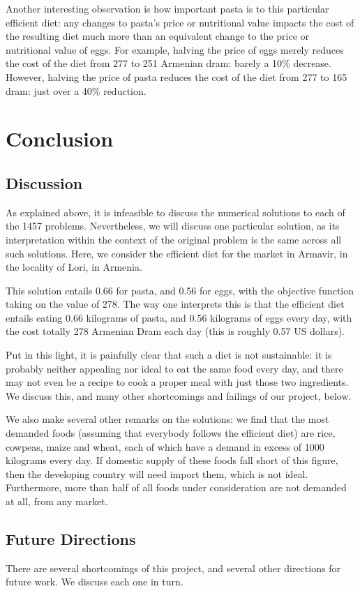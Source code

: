 Another interesting observation is how important pasta is to this particular efficient diet: any changes to pasta's price or nutritional value impacts the cost of the resulting diet much more than an equivalent change to the price or nutritional value of eggs. For example, halving the price of eggs merely reduces the cost of the diet from 277 to 251 Armenian dram: barely a 10\% decrease. However, halving the price of pasta reduces the cost of the diet from 277 to 165 dram: just over a 40\% reduction.

\section{Conclusion}
\subsection{Discussion}
As explained above, it is infeasible to discuss the numerical solutions to each of the 1457 problems. Nevertheless, we will discuss one particular solution, as its interpretation within the context of the original problem is the same across all such solutions. Here, we consider the efficient diet for the market in Armavir, in the locality of Lori, in Armenia.

This solution entails 0.66 for pasta, and 0.56 for eggs, with the objective function taking on the value of 278. The way one interprets this is that the efficient diet entails eating 0.66 kilograms of pasta, and 0.56 kilograms of eggs every day, with the cost totally 278 Armenian Dram each day (this is roughly 0.57 US dollars).

Put in this light, it is painfully clear that such a diet is not sustainable: it is probably neither appealing nor ideal to eat the same food every day, and there may not even be a recipe to cook a proper meal with just those two ingredients. We discuss this, and many other shortcomings and failings of our project, below.

We also make several other remarks on the solutions: we find that the most demanded foods (assuming that everybody follows the efficient diet) are rice, cowpeas, maize and wheat, each of which have a demand in excess of 1000 kilograms every day. If domestic supply of these foods fall short of this figure, then the developing country will need import them, which is not ideal. Furthermore, more than half of all foods under consideration are not demanded at all, from any market.


\subsection{Future Directions}
There are several shortcomings of this project, and several other directions for future work. We discuss each one in turn.

